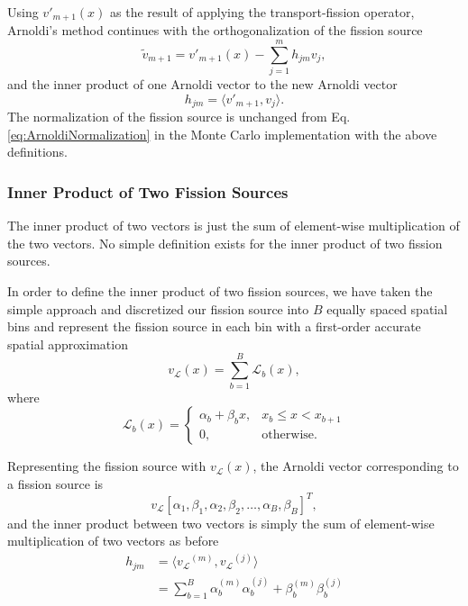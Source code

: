 \documentclass[12]{ansnse}
\newcommand{\Lx}{\ensuremath{\Lin_b(x)}}
\newcommand{\Lin}{\ensuremath{\mathcal{L}}}
\newcommand{\vL}{\ensuremath{v_{\Lin}}}
\begin{document}
\begin{doublespace}
Using $v'_{m+1}(x)$ as the result of applying the transport-fission operator, Arnoldi's method continues with the orthogonalization of the fission source
\begin{equation}
    \tilde{v}_{m+1} = v'_{m+1}(x) - \sum_{j=1}^m h_{jm}v_j,
    \label{eq:MCArnoldiOrthogonalization}
\end{equation}
and the inner product of one Arnoldi vector to the new Arnoldi vector 
\begin{equation}
    h_{jm} = \langle v'_{m+1}, v_j\rangle.
    \label{eq:MCh_jm}
\end{equation}
The normalization of the fission source is unchanged from Eq. \eqref{eq:ArnoldiNormalization} in the Monte Carlo implementation with the above definitions.

\subsubsection{Inner Product of Two Fission Sources}\label{sec:InnerProduct}
The inner product of two vectors is just the sum of element-wise multiplication of the two vectors.  No simple definition exists for the inner product of two fission sources.  


In order to define the inner product of two fission sources, we have taken the simple approach and discretized our fission source into $B$ equally spaced spatial bins and represent the fission source in each bin with a first-order accurate spatial approximation
\begin{equation}
    \vL(x) = \sum_{b=1}^B \Lx,
    \label{eq:LinearSource}
\end{equation}
where
\begin{equation}
    \Lx = \begin{cases}
        \alpha_b + \beta_b x, & x_b \leq x < x_{b+1} \\
        0, & \mathrm{otherwise}.
    \end{cases}
    \label{eq:SecondOrderApproximation}
\end{equation}

Representing the fission source with $\vL(x)$, the Arnoldi vector corresponding to a fission source is
\begin{equation}
    \vL \left[\alpha_1, \beta_1, \alpha_2, \beta_2, \ldots, \alpha_B, \beta_B\right]^T, 
    \label{eq:DiscretizedArnoldiVector}
\end{equation}
and the inner product between two vectors is simply the sum of element-wise multiplication of two vectors as before
\begin{align}
    h_{jm} &= \langle\vL^{(m)}, \vL^{(j)}\rangle \\
    &= \sum_{b=1}^B \alpha_b^{(m)}\alpha_b^{(j)} + \beta_b^{(m)}\beta_b^{(j)}
    \label{eq:DiscretizedInnerProduct}
\end{align}


\end{doublespace}
\end{document}
